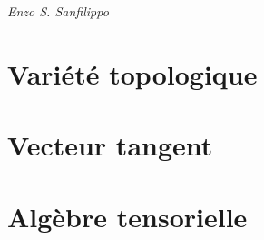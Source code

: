\documentclass{book}
\begin{document}
	
    \begin{titlepage}

        \vspace*{9em}{\centering\Huge Géométrie avancée\par}
        \vspace{2em}
        {\hfill\itshape Enzo S. Sanfilippo}

        \clearpage
	    \vspace*{\fill}
    \end{titlepage}

    \newpage

    {
		\hypersetup{linkcolor=magenta}
		\tableofcontents
	}

    \newpage

    \chapter{Variété topologique}{
        \newpage

        
    }

	\chapter{Vecteur tangent}{
		\newpage

		
	}
	
	\chapter{Algèbre tensorielle}{
		\newpage

		
	}
\end{document}
